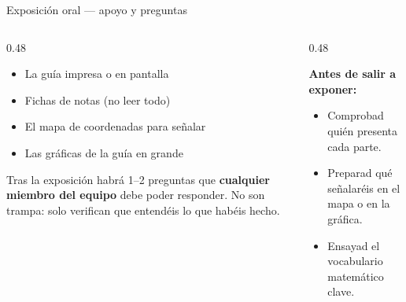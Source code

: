\documentclass[aspectratio=169, 10pt, spanish]{beamer}
\begin{document}
\begin{frame}{Exposición oral — apoyo y preguntas}
  \begin{columns}[T]
    \begin{column}{0.48\textwidth}
      \begin{notabox}
        \begin{itemize}
          \item La guía impresa o en pantalla
          \item Fichas de notas (no leer todo)
          \item El mapa de coordenadas para señalar
          \item Las gráficas de la guía en grande
        \end{itemize}
      \end{notabox}

      \begin{notabox}
        \AlmFontFootnote
        Tras la exposición habrá 1--2 preguntas
        que \textbf{cualquier miembro del equipo}
        debe poder responder. No son trampa:
        solo verifican que entendéis lo que
        habéis hecho.
      \end{notabox}
    \end{column}
    \begin{column}{0.48\textwidth}
      \begin{teoriabox}
        \AlmFontFootnote
        \textbf{Antes de salir a exponer:}
        \begin{itemize}
          \item Comprobad quién presenta cada parte.
          \item Preparad qué señalaréis en el mapa o en la gráfica.
          \item Ensayad el vocabulario matemático clave.
        \end{itemize}
      \end{teoriabox}
    \end{column}
  \end{columns}
\end{frame}

\end{document}
